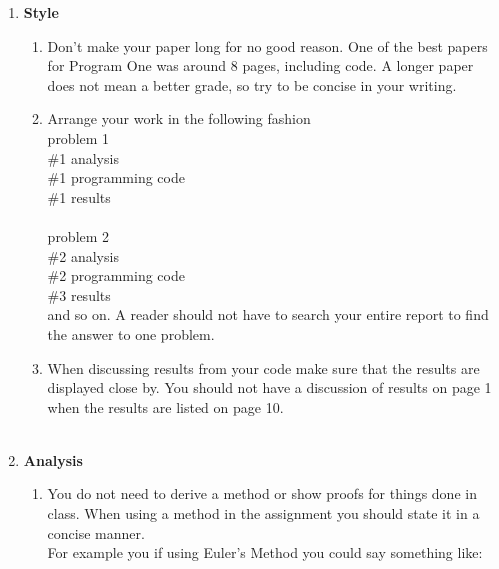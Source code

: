 \documentclass[8pt]{article}
\begin{document}
 \begin{enumerate}


\item \textbf{Style}\\


\begin{enumerate}
\item  Don't make your paper long for no good reason.  One of the best papers for Program One was around 8 pages, including code.  A longer paper does not mean a better grade, so try to be concise in your writing.

\item Arrange your work in the following fashion\\


problem 1\\
 \#1 analysis\\
\#1 programming code\\
 \#1 results\\ \\
 
 problem 2\\
 \#2 analysis\\
 \#2 programming code\\
 \#3 results\\
 
 and so on.  A reader should not have to search your entire report to find the answer to one problem.\\
 
 
\item When discussing results from your code make sure that the results are displayed close by.  You should not have a discussion of results on page 1 when the results are listed on page 10.  \\ \\
 
\end{enumerate}
 
 
 \item 
 \textbf{Analysis}\\
 
 \begin{enumerate}
 
 \item
 You do not need to derive a method or show proofs for things done in class.  When using a method in the assignment you should state it in a concise manner.\\
 
 For example you if using Euler's Method you could say something like:\\
 

\end{enumerate}
\end{enumerate}
\end{document}
